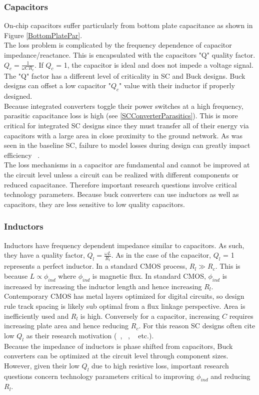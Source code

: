 \documentclass[letterpaper,twocolumn,10pt]{article}
\begin{document}
\subsubsection{Capacitors }
On-chip capacitors suffer particularly from bottom plate capacitance as shown in Figure \ref{BottomPlatePar}.\\
The loss problem is complicated by the frequency dependence of capacitor impedance/reactance. This is encapsulated with the capacitors "Q" quality factor. $Q_c=\frac{1}{\omega CR_c}$. If $Q_c$ = 1, the capacitor is ideal and does not impede a voltage signal. The "Q" factor has a different level of criticality in SC and Buck designs. Buck designs can offset a low capacitor "$Q_c$" value with their inductor if properly designed.\\
Because integrated converters toggle their power switches at a high frequency, parasitic capacitance loss is high (see \ref{SCConverterParasitics}). This is more critical for integrated SC designs since they must transfer all of their energy via capacitors with a large area in close proximity to the ground network. As was seen in the baseline SC, failure to model losses during design can greatly impact efficiency ~\cite{Viraj2007}.\\
\indent The loss mechanisms in a capacitor are fundamental and cannot be improved at the circuit level unless a circuit can be realized with different components or reduced capacitance. Therefore important research questions involve critical technology parameters. Because buck converters can use inductors as well as capacitors, they are less sensitive to low quality capacitors.\\
\subsubsection{Inductors }
Inductors have frequency dependent impedance similar to capacitors. As such, they have a quality factor, $Q_l = \frac{\omega L}{R_l}$. As in the case of the capacitor, $Q_l$ = 1 represents a perfect inductor. In a standard CMOS process, $R_l \gg R_c$. This is because $L \propto \phi_{ind}$ where $\phi_{ind}$ is magnetic flux. In standard CMOS, $\phi_{ind}$ is increased by increasing the inductor length and hence increasing $R_l$. Contemporary CMOS has metal layers optimized for digital circuits, so design rule track spacing is likely sub optimal from a flux linkage perspective. Area is inefficiently used and $R_l$ is high. Conversely for a capacitor, increasing $C$ requires increasing plate area and hence reducing $R_c$. For this reason SC designs often cite low $Q_l$ as their research motivation (~\cite{Pique2012}, ~\cite{Yogesh2010}, ~\cite{PhuckLe2011} etc.).\\
\indent Because the impedance of inductors is phase shifted from capacitors, Buck converters can be optimized at the circuit level through component sizes. However, given their low $Q_l$ due to high resistive loss, important research questions concern technology parameters critical to improving $\phi_{ind}$ and reducing $R_l$.\\    
\end{document}
